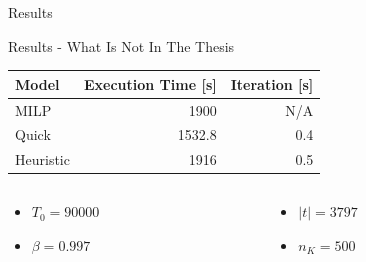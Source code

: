 \documentclass[aspectratio=169]{beamer}
\begin{document}
\begin{frame}[label={sec:org4ee59dd}]{Results}
\begin{frame}[label={sec:orgc5978d5}]{Results - What Is Not In The Thesis}
\begin{center}
\begin{tabular}{lrr}
\alert{Model} & \alert{Execution Time} [s] & \alert{Iteration} [s]\\[0pt]
\hline
MILP & 1900 & N/A\\[0pt]
Quick & 1532.8 & 0.4\\[0pt]
Heuristic & 1916 & 0.5\\[0pt]
\end{tabular}
\end{center}

\begin{columns}
\begin{column}{0.5\columnwidth}
\begin{itemize}
\item \(T_0 = 90000\)
\item \(\beta = 0.997\)
\end{itemize}
\end{column}
\begin{column}{0.5\columnwidth}
\begin{itemize}
\item \(|t| = 3797\)
\item \(n_K = 500\)
\end{itemize}
\end{column}
\end{columns}
\end{frame}


\end{frame}
\end{document}
